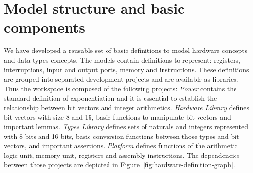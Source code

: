 \documentclass[a4paper]{llncs}
\begin{document}



\section{Model structure and basic components}
\label{sec:models}

We have developed a reusable set of basic definitions to model
hardware concepts and data types concepts. The models contain
definitions to represent: registers, interruptions, input and
output ports, memory and instructions. These definitions are grouped
into separated development projects and are available as libraries.
Thus the workspace is composed of the following projects: \textit{Power}
contains the standard definition of exponentiation and it is essential
to establish the relationship between bit vectors
and integer arithmetics. \textit{Hardware Library} defines bit vectors
with size 8 and 16, basic functions to manipulate bit vectors and
important lemmas. \textit{Types Library} defines sets of naturals and integers represented
with 8 bits and 16 bits, basic conversion functions between those
types and bit vectors, and important assertions. \textit{Platform} defines functions of the arithmetic logic unit, memory
unit, registers and assembly instructions. The dependencies between those projects are depicted in
Figure~\ref{fig:hardware-definition-graph}.
\end{document}
